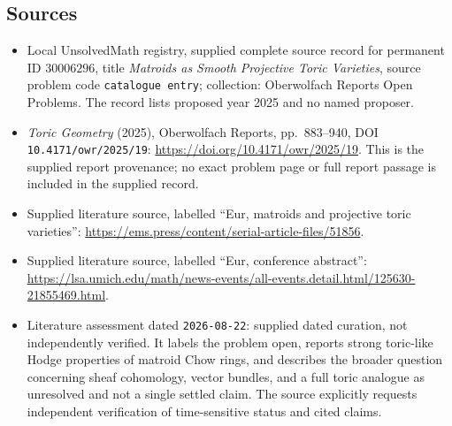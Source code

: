 \documentclass[11pt]{article}
\begin{document}
\subsection{Sources}
\begin{itemize}
\item Local UnsolvedMath registry, supplied complete source record for permanent ID \(30006296\), title \emph{Matroids as Smooth Projective Toric Varieties}, source problem code \texttt{catalogue entry}; collection: Oberwolfach Reports Open Problems. The record lists proposed year 2025 and no named proposer.
\item \emph{Toric Geometry} (2025), Oberwolfach Reports, pp.\ 883--940, DOI \texttt{10.4171/owr/2025/19}: \url{https://doi.org/10.4171/owr/2025/19}. This is the supplied report provenance; no exact problem page or full report passage is included in the supplied record.
\item Supplied literature source, labelled ``Eur, matroids and projective toric varieties'': \url{https://ems.press/content/serial-article-files/51856}.
\item Supplied literature source, labelled ``Eur, conference abstract'': \url{https://lsa.umich.edu/math/news-events/all-events.detail.html/125630-21855469.html}.
\item Literature assessment dated \texttt{2026-08-22}: supplied dated curation, not independently verified. It labels the problem open, reports strong toric-like Hodge properties of matroid Chow rings, and describes the broader question concerning sheaf cohomology, vector bundles, and a full toric analogue as unresolved and not a single settled claim. The source explicitly requests independent verification of time-sensitive status and cited claims.
\end{itemize}
\end{document}
